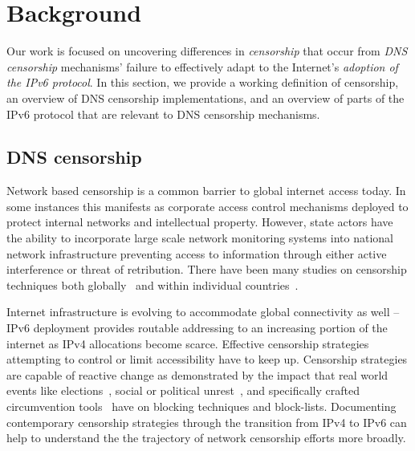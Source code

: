 \section{Background}\label{sec:background}
Our work is focused on uncovering differences in {\em censorship} that occur
from {\em DNS censorship} mechanisms' failure to effectively adapt to the Internet's
{\em adoption of the IPv6 protocol}. 
%
In this section, we provide a working definition of censorship, an overview of
DNS censorship implementations, and an overview of parts of the IPv6 protocol
that are relevant to DNS censorship mechanisms.


\subsection{DNS censorship}\label{sec:background:dns}


Network based censorship is a common barrier to global internet access today.
In some instances this manifests as corporate access control mechanisms deployed
to protect internal networks and intellectual property. However,
state actors have the ability to incorporate large scale network monitoring
systems into national network infrastructure preventing access to information
through either active interference or threat of retribution. There
have been many studies on censorship techniques both
globally~\cite{pearce2017global,niaki2020iclab,scott2016satellite,sundara2020censored,filasto2012ooni,pearce2017augur}
and within individual countries~\cite{USESEC21:GFWatch,aryan2013internet,ramesh2020decentralized,yadav2018light,gebhart2017internet,nabi2013anatomy}.

Internet infrastructure is evolving to accommodate global connectivity as well
-- IPv6 deployment provides routable addressing to an increasing portion of the
internet as IPv4 allocations become scarce. Effective censorship strategies
attempting to control or limit accessibility have to keep up.
Censorship strategies are capable of reactive change as demonstrated by
the impact that real world events like elections~\cite{aryan2013internet},
social or political unrest~\cite{shandler2018measuring,padmanabhan2021multi},
and specifically crafted circumvention tools~\cite{beznazwy2020china}
have on blocking techniques and block-lists. Documenting contemporary censorship
strategies through the transition from IPv4 to IPv6 can help to understand the
the trajectory of network censorship efforts more broadly.



